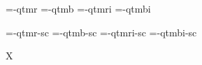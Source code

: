 

\ifx\sizespec\undefined \def\sizespec{}\fi
\ifx\font\corkencoded {}\else {}\fi

\ifx\font\unicoded  {} 
\else

\font\tenrm=\tmp-qtmr  \sizespec
\font\tenbf=\tmp-qtmb  \sizespec
\font\tenit=\tmp-qtmri \sizespec
\font\tenbi=\tmp-qtmbi \sizespec

\font\tenrmc=\tmp-qtmr-sc  \sizespec
\font\tenbfc=\tmp-qtmb-sc  \sizespec
\font\tenitc=\tmp-qtmri-sc \sizespec
\font\tenbic=\tmp-qtmbi-sc \sizespec

\fi

\tenrm

\def\caps#1{{\escapechar=-1 \expandafter}%
  \expandafter\csname\expandafter\tenonlytext\string#1c\endcsname}
\def\tenonlytext{ten}

\ifx\font\corkencoded\else \ifx\font\unicoded\else  \fi\fi
\ifx\mathpreloaded X\else  \fi                     


